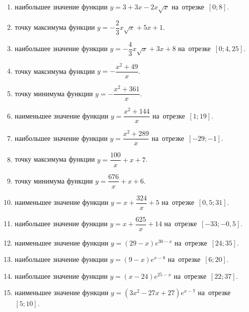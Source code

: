 \documentclass[a4paper,10pt]{article}
\begin{document}
\begin{enumerate}
\item {} наибольшее значение функции $y=3+3x -2x\sqrt{x}$ на~отрезке~$\left[0;8\right]$.

\item {} точку максимума функции $y=-\dfrac{2}{3}x\sqrt{x} +5x+1$.

\item {} наибольшее значение функции $y=-\dfrac{4}{3}x\sqrt{x} +3x+8$ на~отрезке~$\left[0;4,25\right]$.

\item {} точку максимума функции $y=-\dfrac{x^2 +49}{x}$.

\item {} точку минимума функции $y=-\dfrac{x^2 +361}{x}$.

\item {} наименьшее значение функции $y=\dfrac{x^2 +144}{x}$ на~отрезке~$\left[1;19\right]$.

\item {} наибольшее значение функции $y=\dfrac{x^2 +289}{x}$ на~отрезке~$\left[-29;-1\right]$.

\item {} точку максимума функции $y=\dfrac{100}{x} +x+7$.

\item {} точку минимума функции $y=\dfrac{676}{x} +x+6$.

\item {} наименьшее значение функции $y=x+\dfrac{324}{x} +5$ на~отрезке~$\left[0,5;31\right]$.

\item {} наибольшее значение функции $y=x+\dfrac{625}{x} +14$ на~отрезке~$\left[-33;-0,5\right]$.

\item {} наименьшее значение функции $y=\left(29-x\right)e^{30-x}$ на~отрезке~$\left[24;35\right]$.

\item {} наибольшее значение функции $y=\left(9-x\right)e^{x-8}$ на~отрезке~$\left[6;20\right]$.

\item {} наибольшее значение функции $y=\left(x-24\right)e^{25-x}$ на~отрезке~$\left[22;37\right]$.

\item {} наименьшее значение функции $y=\left(3x^2 -27x +27\right)e^{x -7}$ на~отрезке~$\left[5;10\right]$.


\end{enumerate}
\end{document}
